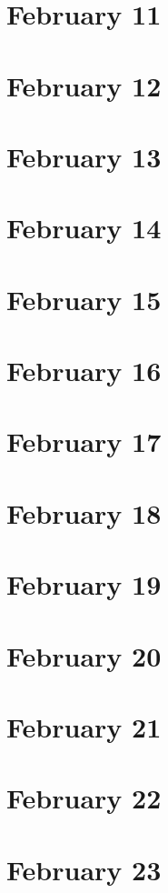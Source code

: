 \section{February 11}

\section{February 12}

\section{February 13}

\section{February 14}

\section{February 15}

\section{February 16}

\section{February 17}

\section{February 18}

\section{February 19}

\section{February 20}

\section{February 21}

\section{February 22}

\section{February 23}


